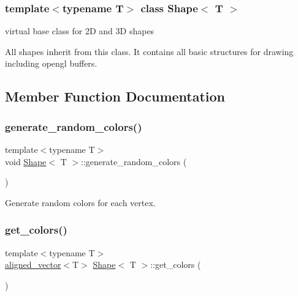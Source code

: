 \subsubsection*{template$<$typename T$>$\newline
class Shape$<$ T $>$}

virtual base class for 2D and 3D shapes 

All shapes inherit from this class. It contains all basic structures for drawing including opengl buffers. 

\subsection{Member Function Documentation}
\mbox{\label{classShape_aabeb601fe95b412987d5b5c276bf8a7a}} 
\subsubsection{\texorpdfstring{generate\+\_\+random\+\_\+colors()}{generate\_random\_colors()}}
{\footnotesize\ttfamily template$<$typename T$>$ \\
void \mbox{\hyperlink{classShape}{Shape}}$<$ T $>$\+::generate\+\_\+random\+\_\+colors (\begin{DoxyParamCaption}{ }\end{DoxyParamCaption})\hspace{0.3cm}{\ttfamily [inline]}}



Generate random colors for each vertex. 

\mbox{\label{classShape_aabe9bd208b0ece9824cb45deccc11ba7}} 
\subsubsection{\texorpdfstring{get\+\_\+colors()}{get\_colors()}}
{\footnotesize\ttfamily template$<$typename T$>$ \\
\mbox{\hyperlink{type__definitions_8hpp_accb98a876f193a416d9c8a02fe22d526}{aligned\+\_\+vector}}$<$T$>$ \mbox{\hyperlink{classShape}{Shape}}$<$ T $>$\+::get\+\_\+colors (\begin{DoxyParamCaption}{ }\end{DoxyParamCaption})\hspace{0.3cm}{\ttfamily [inline]}}

